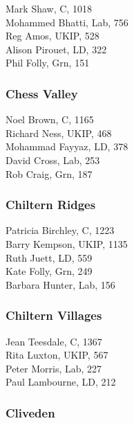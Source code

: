 \documentclass[a4paper,openany,10pt]{book}
\begin{document}


Mark Shaw, C, 1018\\
Mohammed Bhatti, Lab, 756\\
Reg Amos, UKIP, 528\\
Alison Pirouet, LD, 322\\
Phil Folly, Grn, 151\\


\subsubsection*{Chess Valley}



Noel Brown, C, 1165\\
Richard Ness, UKIP, 468\\
Mohammad Fayyaz, LD, 378\\
David Cross, Lab, 253\\
Rob Craig, Grn, 187\\


\subsubsection*{Chiltern Ridges}



Patricia Birchley, C, 1223\\
Barry Kempson, UKIP, 1135\\
Ruth Juett, LD, 559\\
Kate Folly, Grn, 249\\
Barbara Hunter, Lab, 156\\


\subsubsection*{Chiltern Villages}



Jean Teesdale, C, 1367\\
Rita Luxton, UKIP, 567\\
Peter Morris, Lab, 227\\
Paul Lambourne, LD, 212\\


\subsubsection*{Cliveden}
\end{document}
